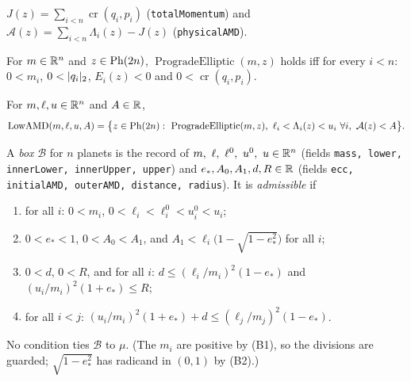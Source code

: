 \begin{definition}\label{bpP:p0:d25-amd}
$J(z)=\sum_{i<n}\operatorname{cr}(q_i,p_i)$ (\texttt{totalMomentum}) and $\mathcal A(z)=\sum_{i<n}\Lambda_i(z)-J(z)$ (\texttt{physicalAMD}).
\end{definition}

\begin{definition}\label{bpP:p0:d25-prograde}
For $m\in\mathbb{R}^n$ and $z\in\mathrm{Ph}(2n)$, $\operatorname{ProgradeElliptic}(m,z)$ holds iff for every $i<n$:
$0<m_i$, $0<\lvert q_i\rvert_2$, $E_i(z)<0$ and $0<\operatorname{cr}(q_i,p_i)$.
\end{definition}

\begin{definition}\label{bpP:p0:d25-lowamd}
For $m,\ell,u\in\mathbb{R}^n$ and $A\in\mathbb{R}$,
\[\operatorname{LowAMD}(m,\ell,u,A)=\bigl\{z\in\Ph{2n}:\ \operatorname{ProgradeElliptic}(m,z),\ \ell_i<\Lambda_i(z)<u_i\ \forall i,\ \mathcal A(z)<A\bigr\}.\]
\end{definition}

\begin{definition}\label{bpP:p0:d25-box}
A \emph{box} $\mathcal B$ for $n$ planets is the record of $m,\ \ell,\ \ell^0,\ u^0,\ u\in\R^n$ (fields \texttt{mass, lower, innerLower, innerUpper, upper}) and
$e_*,A_0,A_1,d,R\in\mathbb{R}$ (fields \texttt{ecc, initialAMD, outerAMD, distance, radius}). It is \emph{admissible} if
\begin{enumerate}[label=(B\arabic*)]
\item for all $i$: $0<m_i$, $0<\ell_i<\ell^0_i<u^0_i<u_i$;
\item $0<e_*<1$, $0<A_0<A_1$, and $A_1<\ell_i\bigl(1-\sqrt{1-e_*^2}\bigr)$ for all $i$;
\item $0<d$, $0<R$, and for all $i$: $d\le(\ell_i/m_i)^2(1-e_*)$ and $(u_i/m_i)^2(1+e_*)\le R$;
\item for all $i<j$: $(u_i/m_i)^2(1+e_*)+d\le(\ell_j/m_j)^2(1-e_*)$.
\end{enumerate}
No condition ties $\mathcal B$ to $\mu$. (The $m_i$ are positive by (B1), so the divisions are guarded; $\sqrt{1-e_*^2}$ has radicand in $(0,1)$ by (B2).)
\end{definition}

